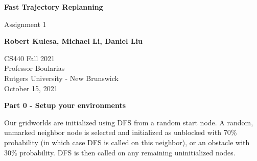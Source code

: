 \documentclass[11pt]{article}
\begin{document}
    \begin{titlepage}
        \begin{center}
            \vspace*{1cm}

            \Huge
            \textbf{Fast Trajectory Replanning}

            \vspace{0.5cm}
            \LARGE
            Assignment 1

            \vspace{1cm}

            \textbf{Robert Kulesa, Michael Li, Daniel Liu}

            \vfill


            \vspace{0.8cm}

            \Large
            CS440 Fall 2021\\
            Professor Boularias\\
            Rutgers University - New Brunswick\\
            October 15, 2021

        \end{center}
    \end{titlepage}
    \begin{center}
        \Large
        \textbf{Part 0 - Setup your environments}
    \end{center}
    \normalsize
    Our gridworlds are initialized using DFS from a random start node.
    A random, unmarked neighbor node is selected and initialized as unblocked with 70\% probability (in which case DFS is called on this neighbor), or an obstacle with 30\% probability.
    DFS is then called on any remaining uninitialized nodes.
\end{document}
